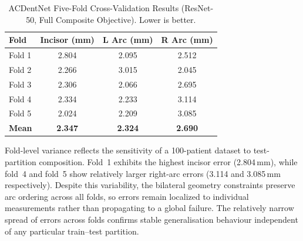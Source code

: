 \documentclass[conference]{IEEEtran}
\begin{document}
\begin{table}[htbp]
\caption{ACDentNet Five-Fold Cross-Validation Results (ResNet-50, Full Composite Objective).
Lower is better.}
\begin{center}
\begin{tabular}{|l|c|c|c|}
\hline
\textbf{Fold} & \textbf{Incisor (mm)} & \textbf{L Arc (mm)} & \textbf{R Arc (mm)} \\
\hline
Fold 1 & 2.804 & 2.095 & 2.512 \\
Fold 2 & 2.266 & 3.015 & 2.045 \\
Fold 3 & 2.306 & 2.066 & 2.695 \\
Fold 4 & 2.334 & 2.233 & 3.114 \\
Fold 5 & 2.024 & 2.209 & 3.085 \\
\hline
\textbf{Mean} & \textbf{2.347} & \textbf{2.324} & \textbf{2.690} \\
\hline
\end{tabular}
\label{tab:cv_results}
\end{center}
\end{table}

Fold-level variance reflects the sensitivity of a 100-patient dataset to test-partition
composition. Fold~1 exhibits the highest incisor error (2.804\,mm), while fold~4 and fold~5
show relatively larger right-arc errors (3.114 and 3.085\,mm respectively). Despite this
variability, the bilateral geometry constraints preserve arc ordering across all folds, so
errors remain localized to individual measurements rather than propagating to a global
failure. The relatively narrow spread of errors across folds confirms stable generalisation
behaviour independent of any particular train--test partition.
\end{document}

